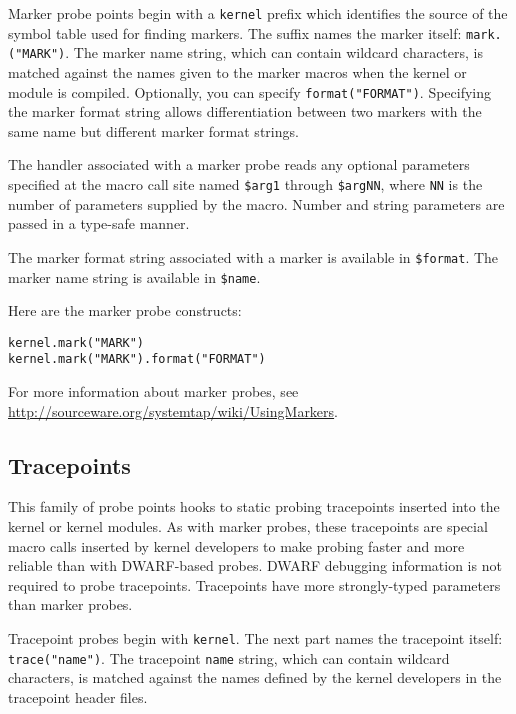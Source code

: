 \documentclass[twoside,english]{article}
\newenvironment{vindent}
{\begin{list}{}{\setlength{\listparindent}{6pt}}
\item[]}
{\end{list}}
\begin{document}
Marker probe points begin with a \texttt{kernel} prefix which
identifies the source of the symbol table used for finding
markers. The suffix names the marker itself:
\texttt{mark.("MARK")}. The marker name string, which can contain
wildcard characters, is matched against the names given to the marker
macros when the kernel or module is compiled.  Optionally, you can
specify \texttt{format("FORMAT")}.  Specifying the marker format
string allows differentiation between two markers with the same name
but different marker format strings.

The handler associated with a marker probe reads any optional
parameters specified at the macro call site named \texttt{\$arg1}
through \texttt{\$argNN}, where \texttt{NN} is the number of
parameters supplied by the macro. Number and string parameters are
passed in a type-safe manner.

The marker format string associated with a marker is available in
\texttt{\$format}. The marker name string is available in
\texttt{\$name}.

Here are the marker probe constructs:
\begin{vindent}
\begin{verbatim}
kernel.mark("MARK")
kernel.mark("MARK").format("FORMAT")
\end{verbatim}
\end{vindent}

For more information about marker probes, see
\url{http://sourceware.org/systemtap/wiki/UsingMarkers}.


\subsection{Tracepoints}
\label{sec:tracepoints}

This family of probe points hooks to static probing tracepoints
inserted into the kernel or kernel modules.  As with marker probes,
these tracepoints are special macro calls inserted by kernel
developers to make probing faster and more reliable than with
DWARF-based probes.  DWARF debugging information is not required to
probe tracepoints.  Tracepoints have more strongly-typed parameters
than marker probes.

Tracepoint probes begin with \texttt{kernel}.  The next part names the
tracepoint itself: \texttt{trace("name")}.  The tracepoint
\texttt{name} string, which can contain wildcard characters, is
matched against the names defined by the kernel developers in the
tracepoint header files.
\end{document}
